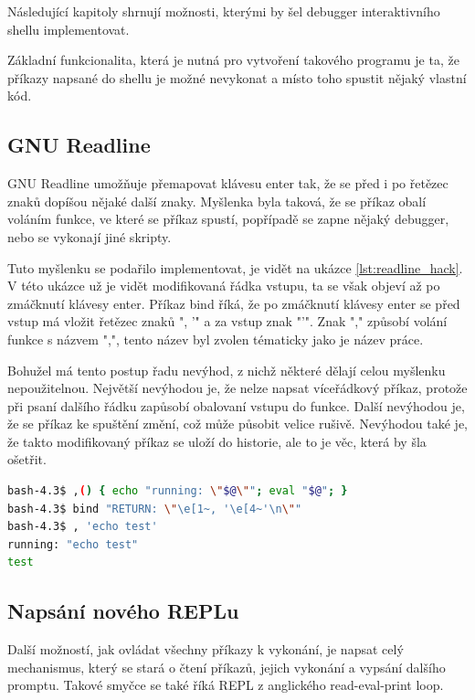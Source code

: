 \documentclass[thesis=M,czech]{FITthesis}[2012/06/26]
\begin{document}
Následující kapitoly shrnují možnosti, kterými by šel debugger interaktivního shellu implementovat.

Základní funkcionalita, která je nutná pro vytvoření takového programu je ta, že příkazy napsané do shellu je možné nevykonat a místo toho spustit nějaký vlastní kód.

\subsection{GNU Readline}

GNU Readline umožňuje přemapovat klávesu enter tak, že se před i po řetězec znaků dopíšou nějaké další znaky. Myšlenka byla taková, že se příkaz obalí voláním funkce, ve které se příkaz spustí, popřípadě se zapne nějaký debugger, nebo se vykonají jiné skripty.

Tuto myšlenku se podařilo implementovat, je vidět na ukázce \ref{lst:readline_hack}. V této ukázce už je vidět modifikovaná řádka vstupu, ta se však objeví až po zmáčknutí klávesy enter. Příkaz bind říká, že po zmáčknutí klávesy enter se před vstup má vložit řetězec znaků ", '" a za vstup znak "'". Znak "," způsobí volání funkce s názvem ",", tento název byl zvolen tématicky jako je název práce.

Bohužel má tento postup řadu nevýhod, z nichž některé dělají celou myšlenku nepoužitelnou. Největší nevýhodou je, že nelze napsat víceřádkový příkaz, protože při psaní dalšího řádku zapůsobí obalovaní vstupu do funkce. Další nevýhodou je, že se příkaz ke spuštění změní, což může působit velice rušivě. Nevýhodou také je, že takto modifikovaný příkaz se uloží do historie, ale to je věc, která by šla ošetřit.

\begin{lstlisting}[language=bash, caption={Modifikace Readline}, label={lst:readline_hack}]
bash-4.3$ ,() { echo "running: \"$@\""; eval "$@"; }
bash-4.3$ bind "RETURN: \"\e[1~, '\e[4~'\n\""
bash-4.3$ , 'echo test'
running: "echo test"
test
\end{lstlisting}

%
%
\subsection{Napsání nového REPLu}

Další možností, jak ovládat všechny příkazy k vykonání, je napsat celý mechanismus, který se stará o čtení příkazů, jejich vykonání a vypsání dalšího promptu. Takové smyčce se také říká REPL z anglického read-eval-print loop.
\end{document}
